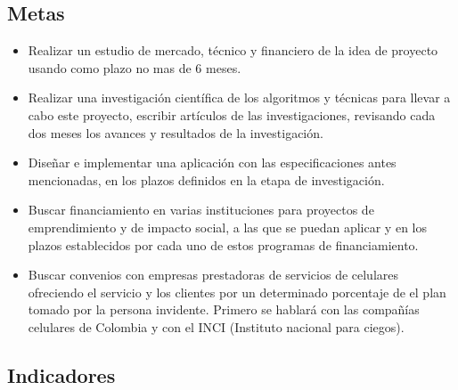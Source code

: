 \documentclass[a4paper, 12pt, oneside]{article}
\begin{document}
	\subsection{Metas}
	\begin{itemize}
	\item Realizar un estudio de mercado, técnico y financiero de la idea de proyecto usando
		como plazo no mas de 6 meses.
	\item Realizar una investigación científica de los algoritmos y técnicas para llevar a cabo este proyecto,
		escribir artículos de las investigaciones, revisando cada dos meses los avances y resultados de la
		investigación.
	\item Diseñar e implementar una aplicación con las especificaciones antes mencionadas, en los plazos
	definidos en la etapa de investigación.
	\item Buscar financiamiento en varias instituciones para proyectos de emprendimiento y
	 de impacto social, a las que se puedan aplicar y en los plazos establecidos por cada uno de estos
	 programas de financiamiento.
	\item Buscar convenios con empresas prestadoras de servicios de celulares ofreciendo el servicio
	 y los clientes por un determinado porcentaje de el plan tomado por la persona invidente. Primero
	 se hablará con las compañías celulares de Colombia y con el INCI (Instituto nacional para ciegos).
	\end{itemize}
	
	\clearpage
	\begin{center}
	\section{Indicadores}
	\end{center}
	
\end{document}
